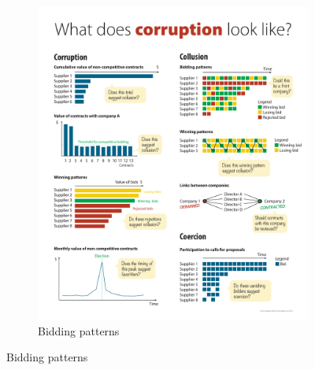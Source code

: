 \begin{figure}[H]
\begin{subfigure}[t]{0.5\textwidth}
\end{subfigure}
~
\begin{subfigure}[t]{0.5\textwidth}
\caption{Bidding patterns}
\label{fig_bid1}
\includegraphics[max width=1\textwidth]{../img/poster_bidding_patt.pdf}
\end{subfigure}

\end{figure}
\clearpage
